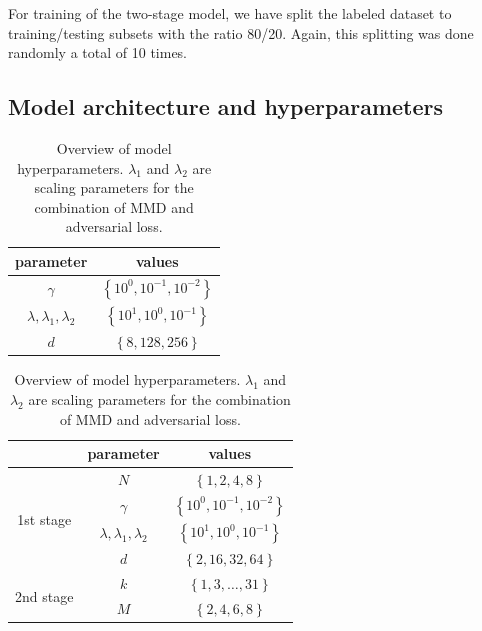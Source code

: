 For training of the two-stage model, we have split the labeled dataset to training/testing subsets with the ratio 80/20. Again, this splitting was done randomly a total of 10 times.

\subsection{Model architecture and hyperparameters}

\begin{table}
\centering

\captionsetup[subtable]{position = below}
\captionsetup[table]{position=below}

\begin{subtable}{0.4\linewidth}
  \centering
  \begin{tabular}{c | c}
     parameter & values\tabularnewline
    \hline 
    $\gamma$ & $\left\{ 10^{0},10^{-1},10^{-2}\right\} $\tabularnewline
    $\lambda,\lambda_{1},\lambda_{2}$ & $\left\{ 10^{1},10^{0},10^{-1}\right\} $\tabularnewline
    $d$ & $\left\{ 8, 128,256\right\} $\tabularnewline
    
  \end{tabular}
  \caption{One-class model.}
  \label{tab:1c_params}
\end{subtable}
\hspace*{4em}
\begin{subtable}{0.4\linewidth}
  \centering
  \begin{tabular}{c  c | c}
      & parameter & values\tabularnewline
    \hline 
    \multirow{4}{*}{1st stage} & $N$ & $\left\{ 1,2,4,8\right\} $\tabularnewline
    & $\gamma$ & $\left\{ 10^{0},10^{-1},10^{-2}\right\} $\tabularnewline
    & $\lambda,\lambda_{1},\lambda_{2}$ & $\left\{ 10^{1},10^{0},10^{-1}\right\} $\tabularnewline
    & $d$ & $\left\{ 2,16,32,64\right\} $\tabularnewline
    \hline
    \multirow{2}{*}{2nd stage} & $k$ & $\left\{ 1,3,\ldots,31\right\} $\tabularnewline
    & $M$ & $\left\{ 2,4,6,8\right\} $\tabularnewline

  \end{tabular}
  \caption{Two-stage model.}
  \label{tab:2s_params}
\end{subtable}
\caption{Overview of model hyperparameters. $\lambda_{1}$ and $\lambda_{2}$ are scaling parameters for the combination of MMD and adversarial loss.}
\end{table}

